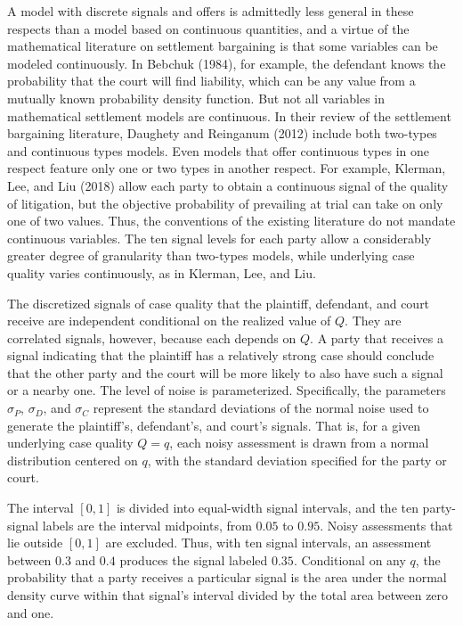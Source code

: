 \documentclass{article}
\begin{document}
A model with discrete signals and offers is admittedly less general in these respects than a model based on continuous quantities, and a virtue of the mathematical literature on settlement bargaining is that some variables can be modeled continuously. In Bebchuk (1984)\cite{bebchuk84}, for example, the defendant knows the probability that the court will find liability, which can be any value from a mutually known probability density function. But not all variables in mathematical settlement models are continuous. In their review of the settlement bargaining literature, Daughety and Reinganum (2012) \cite{daughetyreinganum2012} include both two-types and continuous types models. Even models that offer continuous types in one respect feature only one or two types in another respect. For example, Klerman, Lee, and Liu (2018) \cite{klermanleeliu} allow each party to obtain a continuous signal of the quality of litigation, but the objective probability of prevailing at trial can take on only one of two values. Thus, the conventions of the existing literature do not mandate continuous variables. The ten signal levels for each party allow a considerably greater degree of granularity than two-types models, while underlying case quality varies continuously, as in Klerman, Lee, and Liu.

The discretized signals of case quality that the plaintiff, defendant, and court receive are independent conditional on the realized value of $Q$. They are correlated signals, however, because each depends on $Q$. A party that receives a signal indicating that the plaintiff has a relatively strong case should conclude that the other party and the court will be more likely to also have such a signal or a nearby one. The level of noise is parameterized. Specifically, the parameters $\sigma_P$, $\sigma_D$, and $\sigma_C$ represent the standard deviations of the normal noise used to generate the plaintiff's, defendant's, and court's signals. That is, for a given underlying case quality $Q=q$, each noisy assessment is drawn from a normal distribution centered on $q$, with the standard deviation specified for the party or court. 

The interval $[0,1]$ is divided into equal-width signal intervals, and the ten party-signal labels are the interval midpoints, from $0.05$ to $0.95$. Noisy assessments that lie outside $[0,1]$ are excluded. Thus, with ten signal intervals, an assessment between $0.3$ and $0.4$ produces the signal labeled $0.35$. Conditional on any $q$, the probability that a party receives a particular signal is the area under the normal density curve within that signal's interval divided by the total area between zero and one. 
\end{document}
